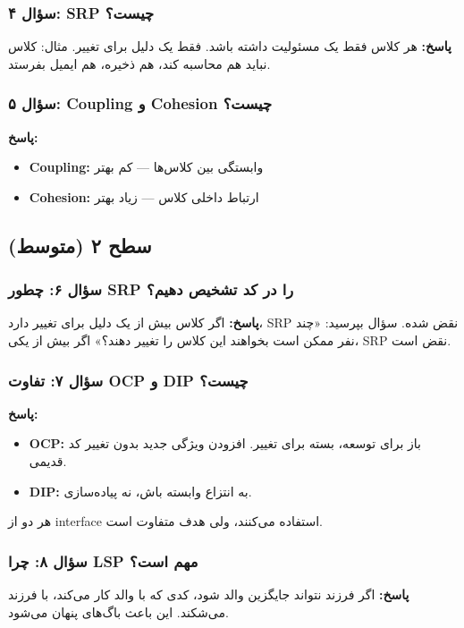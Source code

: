 \documentclass[12pt, a4paper]{article}
\begin{document}
\subsubsection{سؤال ۴: SRP چیست؟}
\textbf{پاسخ:} هر کلاس فقط یک مسئولیت داشته باشد. فقط یک دلیل برای تغییر. 
مثال: کلاس  نباید هم محاسبه کند، هم ذخیره، هم ایمیل بفرستد.

\subsubsection{سؤال ۵: Coupling و Cohesion چیست؟}
\textbf{پاسخ:}
\begin{itemize}
    \item \textbf{Coupling:} وابستگی بین کلاس‌ها — کم بهتر
    \item \textbf{Cohesion:} ارتباط داخلی کلاس — زیاد بهتر
\end{itemize}

\subsection{سطح ۲ (متوسط)}

\subsubsection{سؤال ۶: چطور SRP را در کد تشخیص دهیم؟}
\textbf{پاسخ:} اگر کلاس بیش از یک دلیل برای تغییر دارد، SRP نقض شده. سؤال 
بپرسید: «چند نفر ممکن است بخواهند این کلاس را تغییر دهند؟» اگر بیش از یکی، 
SRP نقض است.

\subsubsection{سؤال ۷: تفاوت OCP و DIP چیست؟}
\textbf{پاسخ:}
\begin{itemize}
    \item \textbf{OCP:} باز برای توسعه، بسته برای تغییر. افزودن ویژگی جدید 
بدون تغییر کد قدیمی.
    \item \textbf{DIP:} به انتزاع وابسته باش، نه پیاده‌سازی.
\end{itemize}
هر دو از interface استفاده می‌کنند، ولی هدف متفاوت است.

\subsubsection{سؤال ۸: چرا LSP مهم است؟}
\textbf{پاسخ:} اگر فرزند نتواند جایگزین والد شود، کدی که با والد کار 
می‌کند، با فرزند می‌شکند. این باعث باگ‌های پنهان می‌شود.
\end{document}
